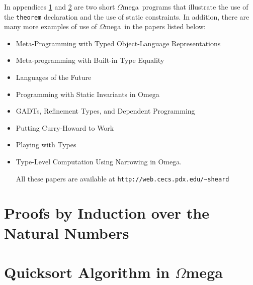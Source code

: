 \documentclass[11pt,twoside]{article}
\newcommand{\om}{$\Omega$mega}
\begin{document}
In appendices \ref{induction} and \ref{quick} are two
short \om\ programs that illustrate the use of the {\tt theorem}
declaration and the use of static constraints. In addition,
there are many more examples of use of \om\ in the papers listed below:
\begin{itemize}

\item Meta-Programming with Typed Object-Language Representations\cite{PasalicLingerGpce}
\item Meta-programming with Built-in Type Equality\cite{SheardLogFrWks04}
\item Languages of the Future\cite{Sheard:2004:LF}
\item Programming with Static Invariants in Omega\cite{SheardLinger}
\item GADTs, Refinement Types, and Dependent Programming\cite{SheardHookLinger}
\item Putting Curry-Howard to Work\cite{CurryHoward}
\item Playing with Types\cite{Playing}
\item Type-Level Computation Using Narrowing in Omega.

All these papers are available at \verb+http://web.cecs.pdx.edu/~sheard+

\end{itemize}

\nocite{*}



\appendix

\section{Proofs by Induction over the Natural Numbers} \label{induction}



\section{Quicksort Algorithm in \om}\label{quick}



\printindex
\end{document}
